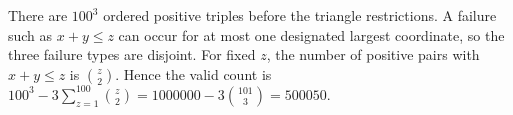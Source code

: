 There are $100^3$ ordered positive triples before the triangle restrictions. A failure such as $x+y\le z$ can occur for at most one designated largest coordinate, so the three failure types are disjoint. For fixed $z$, the number of positive pairs with $x+y\le z$ is $\binom z2$. Hence the valid count is $100^3-3\sum_{z=1}^{100}\binom z2=1000000-3\binom{101}3=\boxed{500050}$.
